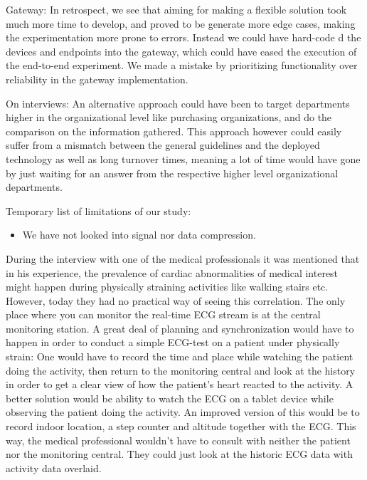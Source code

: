 Gateway: In retrospect, we see that aiming for making a flexible solution took much more time to develop, and proved to be generate more edge cases, making the experimentation more prone to errors. Instead we could have hard-code   d the devices and endpoints into the gateway, which could have eased the execution of the end-to-end experiment. We made a mistake by prioritizing functionality over reliability in the gateway implementation.



On interviews: An alternative approach could have been to target departments higher in the organizational level like purchasing organizations, and do the comparison on the information gathered. This approach however could easily suffer from a mismatch between the general guidelines and the deployed technology as well as long turnover times, meaning a lot of time would have gone by just waiting for an answer from the respective higher level organizational departments.

Temporary list of limitations of our study:

\begin{itemize}

  \item We have not looked into signal nor data compression.

\end{itemize}

During the interview with one of the medical professionals it was mentioned that in his experience, the prevalence of cardiac abnormalities of medical interest might happen during physically straining activities like walking stairs etc. However, today they had no practical way of seeing this correlation. The only place where you can monitor the real-time ECG stream is at the central monitoring station. A great deal of planning and synchronization would have to happen in order to conduct a simple ECG-test on a patient under physically strain: One would have to record the time and place while watching the patient doing the activity, then return to the monitoring central and look at the history in order to get a clear view of how the patient's heart reacted to the activity. A better solution would be ability to watch the ECG on a tablet device while observing the patient doing the activity. An improved version of this would be to record indoor location, a step counter and altitude together with the ECG. This way, the medical professional wouldn't have to consult with neither the patient nor the monitoring central. They could just look at the historic ECG data with activity data overlaid.

